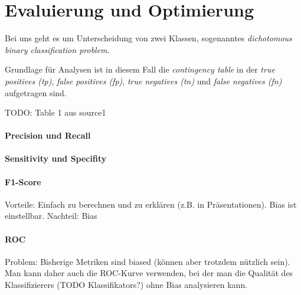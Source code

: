\section{Evaluierung und Optimierung}



Bei uns geht es um Unterscheidung von zwei Klassen, sogenanntes \emph{dichotomous binary classification problem}.

Grundlage für Analysen ist in diesem Fall die \emph{contingency table} in der \emph{true positives (tp)}, \emph{false positives (fp)}, \emph{true negatives (tn)} und \emph{false negatives (fn)} aufgetragen sind.

TODO: Table 1 aus source1

\paragraph{Precision und Recall}

\paragraph{Sensitivity und Specifity}

\paragraph{F1-Score}

Vorteile: Einfach zu berechnen und zu erklären (z.B. in Präsentationen). Bias ist einstellbar.
Nachteil: Bias

\paragraph{ROC}

Problem: Bisherige Metriken sind biased (können aber trotzdem nützlich sein). Man kann daher auch die ROC-Kurve verwenden, bei der man die Qualität des Klassifizierers (TODO Klassifikators?) ohne Bias analysieren kann.

